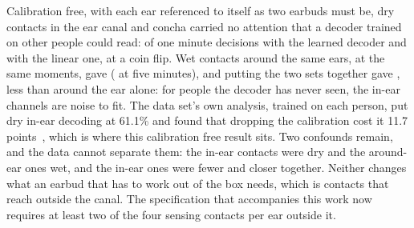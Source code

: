 Calibration free, with each ear referenced to itself as two earbuds must be, dry contacts in the ear canal and concha carried no attention that a decoder trained on other people could read: \earInNn{} of one minute decisions with the learned decoder and \earInLin{} with the linear one, at a coin flip. Wet contacts around the same ears, at the same moments, gave \earAroundNn{} (\earAroundNnFive{} at five minutes), and putting the two sets together gave \earBothNn{}, less than around the ear alone: for people the decoder has never seen, the in-ear channels are noise to fit. The data set's own analysis, trained on each person, put dry in-ear decoding at 61.1\% and found that dropping the calibration cost it 11.7 points~\citep{geirnaert2025}, which is where this calibration free result sits. Two confounds remain, and the data cannot separate them: the in-ear contacts were dry and the around-ear ones wet, and the in-ear ones were fewer and closer together. Neither changes what an earbud that has to work out of the box needs, which is contacts that reach outside the canal. The specification that accompanies this work now requires at least two of the four sensing contacts per ear outside it.
